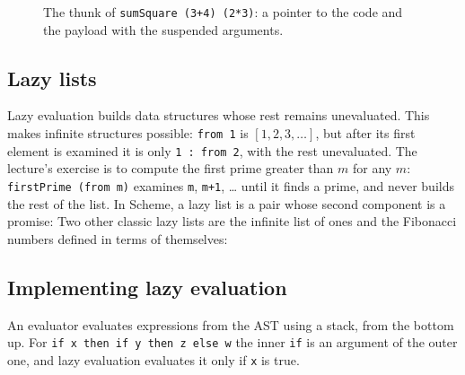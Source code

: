 \begin{figure}[h]
\centering
{}
\caption{The thunk of \texttt{sumSquare (3+4) (2*3)}: a pointer to the code and the payload with the suspended arguments.}
\label{fig:thunk}
\end{figure}

\subsection{Lazy lists}

Lazy evaluation builds data structures whose rest remains unevaluated. This
makes infinite structures possible:
\texttt{from 1} is $[1, 2, 3, \dots]$, but after its first element is examined
it is only \texttt{1 : from 2}, with the rest unevaluated. The lecture's
exercise is to compute the first prime greater than $m$ for any $m$:
\texttt{firstPrime (from m)} examines \texttt{m}, \texttt{m+1}, \dots{} until it
finds a prime, and never builds the rest of the list. In Scheme, a lazy list
is a pair whose second component is a promise:
Two other classic lazy lists are the infinite list of ones and the
Fibonacci numbers defined in terms of themselves:

\subsection{Implementing lazy evaluation}

An evaluator evaluates expressions from the AST using a stack, from the bottom
up. For \texttt{if x then if y then z else w} the inner \texttt{if} is an
argument of the outer one, and lazy evaluation evaluates it only if
\texttt{x} is true.

